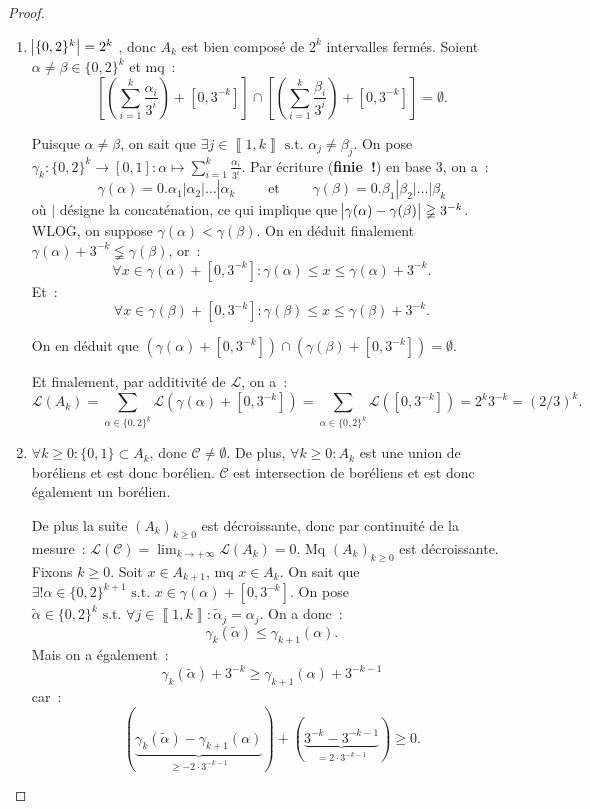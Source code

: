\documentclass{article}
\newcommand{\pinfty}{{+\infty}}
\newcommand{\st}{\text{ s.t. }}
\newcommand{\intint}[2]{\left\llbracket#1, #2\right\rrbracket}
\begin{document}
\begin{proof}~
\begin{enumerate}
	\item $\abs {\{0, 2\}^k} = 2^k$ , donc $A_k$ est bien composé de $2^k$ intervalles fermés. Soient $\alpha \neq \beta \in \{0, 2\}^k$ et mq~:
	\[\left[\left(\sum_{i=1}^k\frac {\alpha_i}{3^i}\right) + [0, 3^{-k}]\right] \cap \left[\left(\sum_{i=1}^k\frac {\beta_i}{3^i}\right) + [0, 3^{-k}]\right] = \emptyset.\]

	Puisque $\alpha \neq \beta$, on sait que $\exists j \in \intint 1k \st \alpha_j \neq \beta_j$. On pose $\gamma_k : \{0, 2\}^k \to [0, 1] :
	\alpha \mapsto \sum_{i=1}^k\frac {\alpha_i}{3^i}$. Par écriture (\textbf{finie~!}) en base 3, on a~:
	\[\gamma(\alpha) = 0.\alpha_1|\alpha_2|\ldots|\alpha_k \qquad \text{ et } \qquad \gamma(\beta) = 0.\beta_1|\beta_2|\ldots|\beta_k\]
	où $|$ désigne la concaténation, ce qui implique que $\abs {\gamma(\alpha) - \gamma(\beta)} \gneqq 3^{-k}$. WLOG, on suppose $\gamma(\alpha) < \gamma(\beta)$.
	On en déduit finalement $\gamma(\alpha) + 3^{-k} \lneqq \gamma(\beta)$, or~:
	\[\forall x \in \gamma(\alpha) + [0, 3^{-k}] : \gamma(\alpha) \leq x \leq \gamma(\alpha) + 3^{-k}.\]
	Et~:
	\[\forall x \in \gamma(\beta) + [0, 3^{-k}] : \gamma(\beta) \leq x \leq \gamma(\beta) + 3^{-k}.\]

	On en déduit que $\left(\gamma(\alpha) + [0, 3^{-k}]\right) \cap \left(\gamma(\beta) + [0, 3^{-k}]\right) = \emptyset$.

	Et finalement, par additivité de $\mathcal L$, on a~:
	\[\mathcal L(A_k) = \sum_{\alpha \in \{0, 2\}^k}\mathcal L(\gamma(\alpha)+[0, 3^{-k}]) = \sum_{\alpha \in \{0, 2\}^k}\mathcal L([0, 3^{-k}]) = 2^k3^{-k} = (2/3)^k.\]

	\item $\forall k \geq 0 : \{0, 1\} \subset A_k$, donc $\mathscr C \neq \emptyset$. De plus, $\forall k \geq 0 : A_k$ est une union de boréliens et est donc borélien.
	$\mathscr C$ est intersection de boréliens et est donc également un borélien.

	De plus la suite $(A_k)_{k \geq 0}$ est décroissante, donc par continuité de la mesure~: $\mathcal L(\mathscr C) = \lim_{k \to \pinfty}\mathcal L(A_k) = 0$.
	Mq $(A_k)_{k \geq 0}$ est décroissante. Fixons $k \geq 0$. Soit $x \in A_{k+1}$, mq $x \in A_k$. On sait que $\exists! \alpha \in \{0, 2\}^{k+1} \st x \in \gamma(\alpha)+[0, 3^{-k}]$.
	On pose $\tilde \alpha \in \{0, 2\}^k \st \forall j \in \intint 1k : \tilde \alpha_j = \alpha_j$. On a donc~:
	\[\gamma_k(\tilde \alpha) \leq \gamma_{k+1}(\alpha).\]
	Mais on a également~:
	\[\gamma_k(\tilde \alpha) + 3^{-k} \geq \gamma_{k+1}(\alpha) + 3^{-k-1}\]
	car~:
	\[(\underbrace {\gamma_k(\tilde \alpha) - \gamma_{k+1}(\alpha)}_{\geq -2 \cdot 3^{-k-1}}) + (\underbrace {3^{-k} - 3^{-k-1}}_{=2\cdot 3^{-k-1}}) \geq 0.\]


\end{enumerate}
\end{proof}
\end{document}
